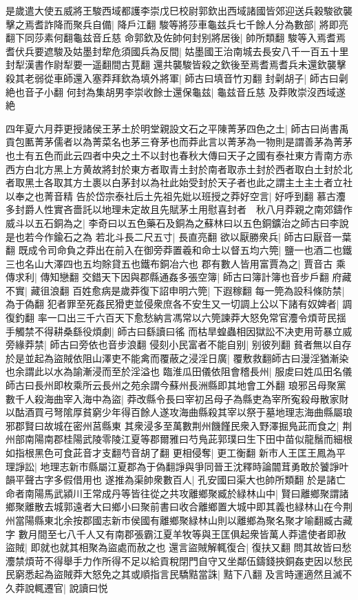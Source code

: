 是歲遣大使五威將王駿西域都護李崇戊巳校尉郭欽出西域諸國皆郊迎送兵穀駿欲襲擊之焉耆詐降而聚兵自備|{
	降戶江翻}
駿等將莎車龜兹兵七千餘人分為數部|{
	將即亮翻下同莎素何翻龜兹音丘慈}
命郭欽及佐帥何封别將居後|{
	帥所類翻}
駿等入焉耆焉耆伏兵要遮駿及姑墨封犂危須國兵為反間|{
	姑墨國王治南城去長安八千一百五十里封犁漢書作尉犁要一遥翻間古莧翻}
還共襲駿皆殺之欽後至焉耆焉耆兵未還欽襲擊殺其老弱從車師還入塞莽拜欽為填外將軍|{
	師古曰填音竹刃翻}
封劋胡子|{
	師古曰劋絶也音子小翻}
何封為集胡男李崇收餘士還保龜兹|{
	龜兹音丘慈}
及莽敗崇沒西域遂絶

四年夏六月莽更授諸侯王茅土於明堂親設文石之平陳菁茅四色之土|{
	師古曰尚書禹貢包匭菁茅儒者以為菁菜名也茅三脊茅也而莽此言以菁茅為一物則是謂善茅為菁茅也土有五色而此云四者中央之土不以封也春秋大傳曰天子之國有泰社東方青南方赤西方白北方黑上方黄故將封於東方者取青土封於南者取赤土封於西者取白土封於北者取黑土各取其方土裹以白茅封以為社此始受封於天子者也此之謂主土主土者立社以奉之也菁音精}
告於岱宗泰社后土先祖先妣以班授之莽好空言|{
	好呼到翻}
慕古灋多封爵人性實吝嗇託以地理未定故且先賦茅土用慰喜封者　秋八月莽親之南郊鑄作威斗以五石銅為之|{
	李奇曰以五色藥石及銅為之蘇林曰以五色銅鑛治之師古曰李說是也若今作鍮石之為}
若北斗長二尺五寸|{
	長直亮翻}
欲以厭勝衆兵|{
	師古曰厭音一葉翻}
既成令司命負之莽出在前入在御旁莽置羲和命士以督五均六筦|{
	鹽一也酒二也鐵三也名山大澤四也五均賖貸五也鐵布銅冶六也}
郡有數人皆用富賈為之|{
	賈音古}
乘傳求利|{
	傳知戀翻}
交錯天下因與郡縣通姦多張空簿|{
	師古曰簿計簿也音步戶翻}
府藏不實|{
	藏徂浪翻}
百姓愈病是歲莽復下詔申明六筦|{
	下遐稼翻}
每一筦為設科條防禁|{
	為于偽翻}
犯者罪至死姦民猾吏並侵衆庶各不安生又一切調上公以下諸有奴婢者|{
	調復釣翻}
率一口出三千六百天下愈愁納言馮常以六筦諫莽大怒免常官灋令煩苛民揺手觸禁不得耕桑繇役煩劇|{
	師古曰繇讀曰徭}
而枯旱蝗蟲相因獄訟不决吏用苛暴立威旁緣莽禁|{
	師古曰旁依也音步浪翻}
侵刻小民富者不能自别|{
	别彼列翻}
貧者無以自存於是並起為盜賊依阻山澤吏不能禽而覆蔽之浸淫日廣|{
	覆敷救翻師古曰漫淫猶漸染也余謂此以水為諭漸浸而至於淫溢也}
臨淮瓜田儀依阻會稽長州|{
	服䖍曰姓瓜田名儀師古曰長州即枚乘所云長州之苑余謂今蘇州長洲縣即其地會工外翻}
琅邪呂母聚黨數千人殺海曲宰入海中為盜|{
	莽改縣令長曰宰初呂母子為縣吏為宰所寃殺母散家財以酤酒買弓弩隂厚貧窮少年得百餘人遂攻海曲縣殺其宰以祭于墓地理志海曲縣屬琅邪郡賢曰故城在密州莒縣東}
其衆浸多至萬數荆州饑饉民衆入野澤掘鳬茈而食之|{
	荆州部南陽南郡桂陽武陵零陵江夏等郡爾雅曰芍鳬茈郭璞曰生下田中苗似龍鬚而細根如指根黑色可食茈音才支翻芍音胡了翻}
更相侵奪|{
	更工衡翻}
新市人王匡王鳳為平理諍訟|{
	地理志新市縣屬江夏郡為于偽翻諍與爭同晉王沈釋時論闒茸勇敢於饕諍叶韻平聲古字多假借用也}
遂推為渠帥衆數百人|{
	孔安國曰渠大也帥所類翻}
於是諸亡命者南陽馬武潁川王常成丹等皆往從之共攻離鄉聚臧於緑林山中|{
	賢曰離鄉聚謂諸鄉聚離散去城郭遠者大曰鄉小曰聚前書曰收合離鄉置大城中即其義也緑林山在今荆州當陽縣東北余按郡國志新市侯國有離鄉聚緑林山則以離鄉為聚名聚才喻翻臧古藏字}
數月間至七八千人又有南郡張霸江夏羊牧等與王匡俱起衆皆萬人莽遣使者即赦盜賊|{
	即就也就其相聚為盜處而赦之也}
還言盜賊解輒復合|{
	復扶又翻}
問其故皆曰愁灋禁煩苛不得舉手力作所得不足以給貢稅閉門自守又坐鄰伍鑄錢挾銅姦吏因以愁民民窮悉起為盜賊莽大怒免之其或順指言民驕黠當誅|{
	黠下八翻}
及言時運適然且滅不久莽說輒遷官|{
	說讀曰悦}


